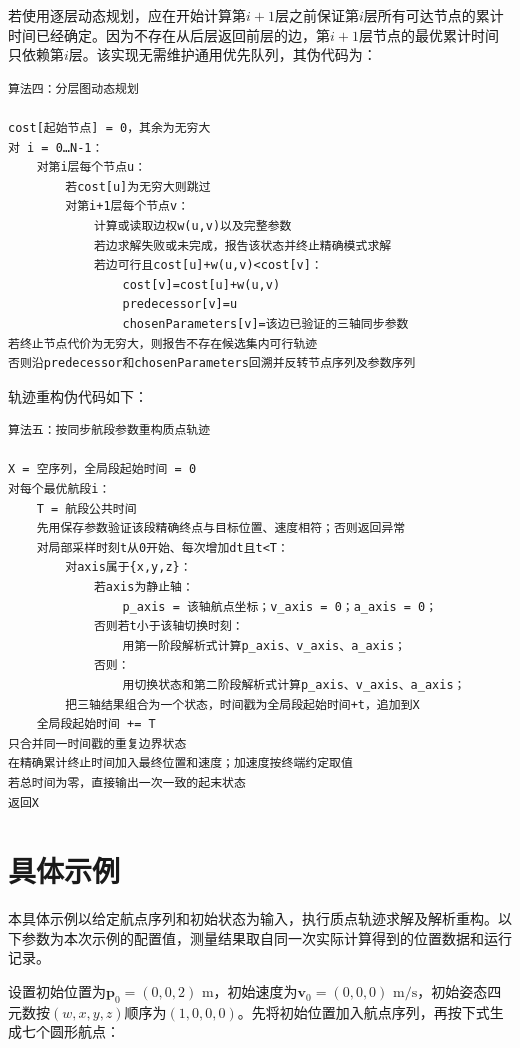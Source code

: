 \documentclass[UTF8,a4paper,12pt,fontset=fandol]{ctexart}
\begin{document}
若使用逐层动态规划，应在开始计算第\(i+1\)层之前保证第\(i\)层所有可达节点的累计时间已经确定。因为不存在从后层返回前层的边，第\(i+1\)层节点的最优累计时间只依赖第\(i\)层。该实现无需维护通用优先队列，其伪代码为：

\begin{lstlisting}[style=patentpseudo]
算法四：分层图动态规划

cost[起始节点] = 0，其余为无穷大
对 i = 0…N-1：
    对第i层每个节点u：
        若cost[u]为无穷大则跳过
        对第i+1层每个节点v：
            计算或读取边权w(u,v)以及完整参数
            若边求解失败或未完成，报告该状态并终止精确模式求解
            若边可行且cost[u]+w(u,v)<cost[v]：
                cost[v]=cost[u]+w(u,v)
                predecessor[v]=u
                chosenParameters[v]=该边已验证的三轴同步参数
若终止节点代价为无穷大，则报告不存在候选集内可行轨迹
否则沿predecessor和chosenParameters回溯并反转节点序列及参数序列
\end{lstlisting}

轨迹重构伪代码如下：

\begin{lstlisting}[style=patentpseudo]
算法五：按同步航段参数重构质点轨迹

X = 空序列，全局段起始时间 = 0
对每个最优航段i：
    T = 航段公共时间
    先用保存参数验证该段精确终点与目标位置、速度相符；否则返回异常
    对局部采样时刻t从0开始、每次增加dt且t<T：
        对axis属于{x,y,z}：
            若axis为静止轴：
                p_axis = 该轴航点坐标；v_axis = 0；a_axis = 0；
            否则若t小于该轴切换时刻：
                用第一阶段解析式计算p_axis、v_axis、a_axis；
            否则：
                用切换状态和第二阶段解析式计算p_axis、v_axis、a_axis；
        把三轴结果组合为一个状态，时间戳为全局段起始时间+t，追加到X
    全局段起始时间 += T
只合并同一时间戳的重复边界状态
在精确累计终止时间加入最终位置和速度；加速度按终端约定取值
若总时间为零，直接输出一次一致的起末状态
返回X
\end{lstlisting}

\section{具体示例}

本具体示例以给定航点序列和初始状态为输入，执行质点轨迹求解及解析重构。以下参数为本次示例的配置值，测量结果取自同一次实际计算得到的位置数据和运行记录。

设置初始位置为\(\boldsymbol p_0=(0,0,2)\text{ m}\)，初始速度为\(\boldsymbol v_0=(0,0,0)\text{ m/s}\)，初始姿态四元数按\((w,x,y,z)\)顺序为\((1,0,0,0)\)。先将初始位置加入航点序列，再按下式生成七个圆形航点：
\end{document}

